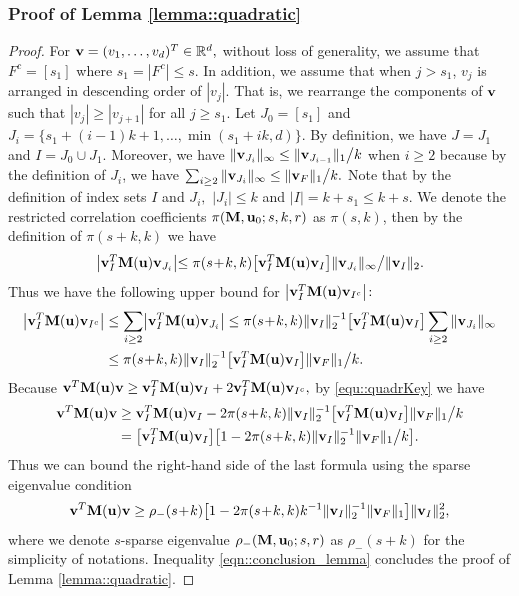 \documentclass[twoside,11pt]{article}
\newcommand*{\BR}{\mathbb{R}}
\begin{document}
\subsubsection{Proof of Lemma \ref{lemma::quadratic}}\label{proof::lemma::quadratic}
\begin{proof} 
 For $\vb = (v_1,\ldots,v_{d})^T\in \BR^d,$ without loss of generality, we assume that $F^c = [s_1] $ where $s_1 \!=\! |F^c| \leq s.$ In addition, we assume that when $j >s_1$, $v_j$ is arranged in descending order of $|v_j|.$ That is, we rearrange the components of $\mathbf{v}$ such that $|v_j| \geq |v_{j+1}| $ for all $j\geq s_1$. Let $J_0 = [s_1]$ and $J_i = \{ s_1 \!+\! (i-1)k\! +\!1, \ldots, \min (s_1 + ik,d)\}$. By definition, we have $J = J_1$ and $I = J_0 \cup J_1.$ Moreover, we have $ \|\mathbf{v}_{J_i} \|_{\infty}\leq  \|\mathbf{v}_{J_{i-1}} \|_1 \big/k$ when $ i \geq 2$ because by the definition of $J_i$, we have
 $
\sum_{i \geq 2} \|\mathbf{v}_{J_i}  \|_{\infty}
\leq  \|\mathbf{v}_F \|_1\big/k.
$
Note that by the definition of index sets $I$ and  $J_i,$ $|J_i| \leq k$ and $|I| = k\!+\!s_1\leq k\!+\!s.$ We denote the restricted correlation coefficients $ \pi (\mathbf{M}, \mathbf{u}_0;s,k,r)$ as $\pi(s,k)$, then  by the definition of $\pi(s\!+\! k,k)$ we have
$$
\bigl | \mathbf{v}_I^T \mathbf{M}(\mathbf{u})\mathbf{v}_{J_i} \bigl| \leq \pi(s\!+\! k,k)  \bigl [\mathbf{v}_I^T \mathbf{M}(\mathbf{u})\mathbf{v}_{I} \bigr] \| \mathbf{v}_{J_i}  \|_\infty \big/  \| \mathbf{v}_I \|_2.
$$
Thus we have the following upper bound for $\bigl | \mathbf{v}_I^T \mathbf{M}(\mathbf{u}) \mathbf{v}_{I^c}\bigl |\colon$
\begin{align}\label{equ::quadrKey}
\bigl | \mathbf{v}_I^T \mathbf{M}(\mathbf{u}) \mathbf{v}_{I^c}\bigl | & \leq \sum\limits_{i\geq2} \bigl | \mathbf{v}_I^T \mathbf{M}(\mathbf{u})\mathbf{v}_{J_i}  \bigr |  \leq  \pi(s\!+\! k,k) \| \mathbf{v}_I   \|_2^{-1}\bigl [\mathbf{v}_I^T \mathbf{M}(\mathbf{u})\mathbf{v}_{I} \bigr] \sum\limits_{i\geq 2}  \| \mathbf{v}_{J_i} \|_\infty \notag \\
&\leq  \pi(s\!+\! k,k)   \| \mathbf{v}_I \|_2^{-1}\bigl [\mathbf{v}_I^T \mathbf{M}(\mathbf{u})\mathbf{v}_{I} \bigr] \| \mathbf{v}_F  \|_1\big/ k.
\end{align}
Because 
$
\mathbf{v}^T \mathbf{M}(\mathbf{u}) \mathbf{v}  \geq \mathbf{v}_I^T \mathbf{M}(\mathbf{u}) \mathbf{v}_{I}  + 2\mathbf{v}_I^T \mathbf{M}(\mathbf{u}) \mathbf{v}_{I^c} ,
$
by \eqref{equ::quadrKey} we have 
\begin{align*}
\mathbf{v}^T \mathbf{M}(\mathbf{u}) \mathbf{v} &\geq \mathbf{v}_I^T \mathbf{M}(\mathbf{u}) \mathbf{v}_{I} - 2  \pi(s\!+\! k,k)   \| \mathbf{v}_I  \|_2^{-1}\bigl [\mathbf{v}_I^T \mathbf{M}(\mathbf{u})\mathbf{v}_{I} \bigr]  \| \mathbf{v}_F  \|_1 \big / k\\
& = \bigl [\mathbf{v}_I^T \mathbf{M}(\mathbf{u})\mathbf{v}_{I} \bigr] \bigl [1 - 2 \pi(s\!+\! k,k)  \| \mathbf{v}_I   \|_2^{-1}\| \mathbf{v}_F \|_1\big / k \bigr ].
\end{align*}
Thus we can bound the right-hand side of the last formula using the sparse eigenvalue condition 
\begin{align}\label{eqn::conclusion_lemma}
\mathbf{v}^T \mathbf{M}(\mathbf{u}) \mathbf{v} \geq \rho_{-}(s\!+\!k) \bigl [1 - 2 \pi(s\!+\! k,k) k^{-1}\| \mathbf{v}_I   \|_2^{-1}\| \mathbf{v}_F  \|_1 \bigr ] \| \mathbf{v}_I \|_2^2,
\end{align}
where we denote $s$-sparse eigenvalue $\rho_{-}(\mathbf{M}, \mathbf{u}_0;s,r) $ as $\rho_{-}(s+k)$ for the simplicity of notations.
Inequality \eqref{eqn::conclusion_lemma} concludes the proof of Lemma \ref{lemma::quadratic}.
\end{proof}
\end{document}
